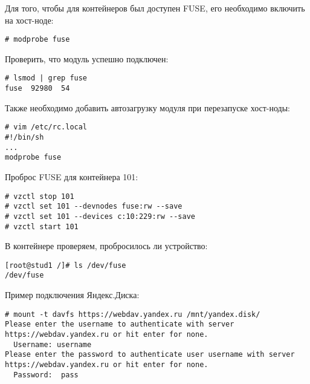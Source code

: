 Для того, чтобы для контейнеров был доступен FUSE, его необходимо включить на хост-ноде:
\begin{lstlisting}
# modprobe fuse
\end{lstlisting}

Проверить, что модуль успешно подключен:
\begin{lstlisting}
# lsmod | grep fuse
fuse  92980  54
\end{lstlisting}

Также необходимо добавить автозагрузку модуля при перезапуске хост-ноды:
\begin{lstlisting}
# vim /etc/rc.local
#!/bin/sh
...
modprobe fuse
\end{lstlisting}

Проброс FUSE для контейнера 101:
\begin{lstlisting}
# vzctl stop 101
# vzctl set 101 --devnodes fuse:rw --save
# vzctl set 101 --devices c:10:229:rw --save
# vzctl start 101
\end{lstlisting}

В контейнере проверяем, пробросилось ли устройство:
\begin{lstlisting}
[root@stud1 /]# ls /dev/fuse
/dev/fuse
\end{lstlisting}

Пример подключения Яндекс.Диска:
\begin{lstlisting}
# mount -t davfs https://webdav.yandex.ru /mnt/yandex.disk/
Please enter the username to authenticate with server
https://webdav.yandex.ru or hit enter for none.
  Username: username
Please enter the password to authenticate user username with server
https://webdav.yandex.ru or hit enter for none.
  Password:  pass
\end{lstlisting}

\clearpage

